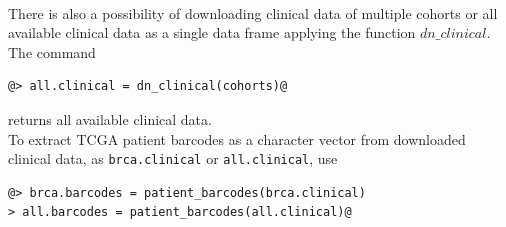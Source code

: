 \documentclass{TechReport}
\begin{document}
\ \\
There is also a possibility of downloading clinical data of multiple cohorts or all
available clinical data as a single data frame
applying the function $dn\_clinical$. The command
\begin{lstlisting}[style=base]
@> all.clinical = dn_clinical(cohorts)@
\end{lstlisting}
returns all available clinical data.\\
To extract TCGA patient barcodes as a character vector from downloaded clinical
data, as {\tt brca.clinical} or {\tt all.clinical}, use
\begin{lstlisting}[style=base]
@> brca.barcodes = patient_barcodes(brca.clinical)
> all.barcodes = patient_barcodes(all.clinical)@
\end{lstlisting}
\end{document}
